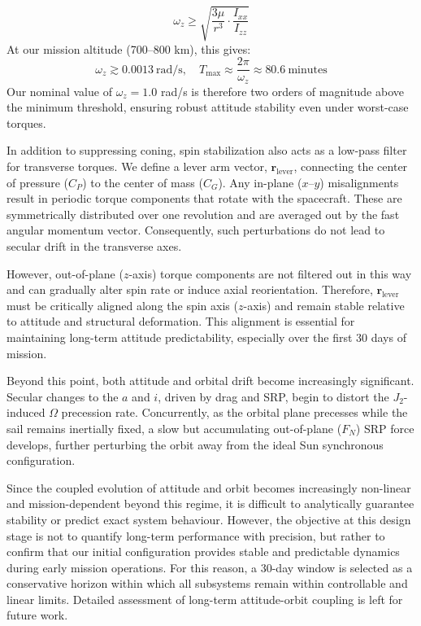 \documentclass[final,3p,times,twocolumn]{elsarticle}
\begin{document}
\begin{equation}
\omega_z \geq \sqrt{\frac{3\mu}{r^3} \cdot \frac{I_{xx}}{I_{zz}}}
\end{equation}
At our mission altitude (700–800 km), this gives:
\[
\omega_z \gtrsim 0.0013~\text{rad/s}, \quad T_{\text{max}} \approx \frac{2\pi}{\omega_z} \approx 80.6~\text{minutes}
\]
Our nominal value of $\omega_z = 1.0$ rad/s is therefore two orders of magnitude above the minimum threshold, ensuring robust attitude stability even under worst-case torques.

\vspace{5pt}
\par\noindent In addition to suppressing coning, spin stabilization also acts as a low-pass filter for transverse torques. We define a lever arm vector, $\mathbf{r}_{\text{lever}}$, connecting the center of pressure ($C_P$) to the center of mass ($C_G$). Any in-plane ($x$–$y$) misalignments result in periodic torque components that rotate with the spacecraft. These are symmetrically distributed over one revolution and are averaged out by the fast angular momentum vector. Consequently, such perturbations do not lead to secular drift in the transverse axes.

\vspace{5pt}
\par\noindent However, out-of-plane ($z$-axis) torque components are not filtered out in this way and can gradually alter spin rate or induce axial reorientation. Therefore, $\mathbf{r}_{\text{lever}}$ must be critically aligned along the spin axis ($z$-axis) and remain stable relative to attitude and structural deformation. This alignment is essential for maintaining long-term attitude predictability, especially over the first 30 days of mission.

\vspace{5pt}
\par\noindent Beyond this point, both attitude and orbital drift become increasingly significant. Secular changes to the \( a \) and \( i \), driven by drag and SRP, begin to distort the \( J_2 \)-induced \( \Omega \) precession rate. Concurrently, as the orbital plane precesses while the sail remains inertially fixed, a slow but accumulating out-of-plane (\( F_N \)) SRP force develops, further perturbing the orbit away from the ideal Sun synchronous configuration.

\vspace{5pt}
\par\noindent Since the coupled evolution of attitude and orbit becomes increasingly non-linear and mission-dependent beyond this regime, it is difficult to analytically guarantee stability or predict exact system behaviour. However, the objective at this design stage is not to quantify long-term performance with precision, but rather to confirm that our initial configuration provides stable and predictable dynamics during early mission operations. For this reason, a 30-day window is selected as a conservative horizon within which all subsystems remain within controllable and linear limits. Detailed assessment of long-term attitude-orbit coupling is left for future work. 
\end{document}
